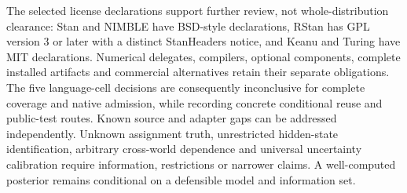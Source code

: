 The selected license declarations support further review, not whole-distribution clearance: Stan and NIMBLE have BSD-style declarations, RStan has GPL version 3 or later with a distinct StanHeaders notice, and Keanu and Turing have MIT declarations. Numerical delegates, compilers, optional components, complete installed artifacts and commercial alternatives retain their separate obligations. The five language-cell decisions are consequently inconclusive for complete coverage and native admission, while recording concrete conditional reuse and public-test routes. Known source and adapter gaps can be addressed independently. Unknown assignment truth, unrestricted hidden-state identification, arbitrary cross-world dependence and universal uncertainty calibration require information, restrictions or narrower claims. A well-computed posterior remains conditional on a defensible model and information set.~\citep{exec25_bsw_stan,exec25_bsw_rstan,exec25_bsw_nimble,exec25_bsw_keanu,exec25_bsw_turing,exec25_bsw_choice}
